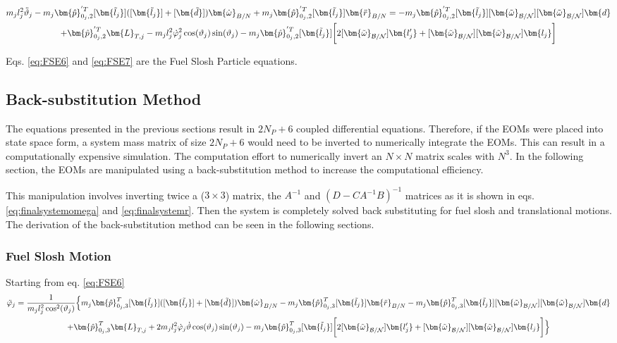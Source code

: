 \begin{multline}
	m_j l_j^2\ddot{\vartheta}_j - m_{j}\bm{\hat{p}}_{0_j,2}^{'T} [\bm{\tilde{l}_j}]( [\bm{\tilde{l}_j}] + [\bm{\tilde{d}}])\bm{\dot{\omega}}_{B/N}
	+m_{j} \bm{\hat{p}}_{0_j,2}^{'T} [\bm{\tilde{l}_j}] \bm{\ddot{r}}_{B/N}
	=-m_{j} \bm{\hat{p}}_{0_j,2}^{'T}[\bm{\tilde{l}_j}][\bm{\tilde{\omega}}_{\cal B/N}][\bm{\tilde{\omega}}_{\cal B/N}] \bm{d}\\+\bm{\hat{p}}_{0_j,2}^{'T} \bm{L}_{T,j}-m_j l_j^2\dot{\varphi}_j^2\cos(\vartheta_j)\sin(\vartheta_j)- m_j \bm{\hat{p}}_{0_j,2}^{'T} [\bm{\tilde{l}_j}]\bigg[2[\bm{\tilde{\omega}}_{\cal B/N}] \bm{l_j'}+[\bm{\tilde{\omega}}_{\cal B/N}][\bm{\tilde{\omega}}_{\cal B/N}] \bm{l_j}\bigg]
	\label{eq:FSE7}
\end{multline}

Eqs. \eqref{eq:FSE6} and \eqref{eq:FSE7} are the Fuel Slosh Particle equations.


\subsection{Back-substitution Method}

The equations presented in the previous sections result in $2N_P + 6$ coupled differential equations. Therefore, if the EOMs were placed into state space form, a system mass matrix of size $2N_P + 6$ would need to be inverted to numerically integrate the EOMs. This can result in a computationally expensive simulation. The computation effort to numerically invert an $N\times N$ matrix scales with $N^{3}$. In the following section, the EOMs are manipulated using a back-substitution method to increase the computational efficiency.

This manipulation involves inverting twice a ($3\times 3$) matrix, the $A^{-1}$ and $(D-CA^{-1}B)^{-1}$ matrices as it is shown in eqs. \eqref{eq:finalsystemomega}  and \eqref{eq:finalsystemr}. Then the system is completely solved back substituting for fuel slosh and translational motions. The derivation of the back-substitution method can be seen in the following sections.
\\

\subsubsection{Fuel Slosh Motion}
Starting from eq. \eqref{eq:FSE6}
\begin{multline}
	\ddot{\varphi}_j  =\frac{1}{m_j l_j^2 \cos^2(\vartheta_j)}\Big\{m_{j}\bm{\hat{p}}_{0_j,3}^T [\bm{\tilde{l}_j}]( [\bm{\tilde{l}_j}]+[\bm{\tilde{d}}]) \bm{\dot{\omega}}_{B/N} -m_{j} \bm{\hat{p}}_{0_j,3}^{T} [\bm{\tilde{l}_j}] \bm{\ddot{r}}_{B/N} -m_{j} \bm{\hat{p}}_{0_j,3}^{T} [\bm{\tilde{l}_j}][\bm{\tilde{\omega}}_{\cal B/N}][\bm{\tilde{\omega}}_{\cal B/N}] \bm{d}\\+\bm{\hat{p}}_{0_j,3}^T \bm{L}_{T,j}+2m_j l_j^2\dot{\varphi}_j\dot{\vartheta}\cos(\vartheta_j)\sin(\vartheta_j)- m_j \bm{\hat{p}}_{0_j,3}^T [\bm{\tilde{l}_j}]\bigg[2[\bm{\tilde{\omega}}_{\cal B/N}] \bm{l_j'}+[\bm{\tilde{\omega}}_{\cal B/N}][\bm{\tilde{\omega}}_{\cal B/N}] \bm{l_j}\bigg]\Big\}
	\label{eq:BSM1}
\end{multline}

